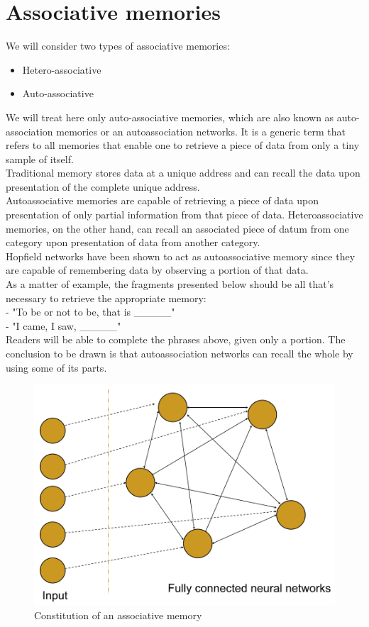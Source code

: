 \section{Associative memories}
We will consider two types of associative memories:
\begin{itemize}
    \item Hetero-associative
    \item Auto-associative
\end{itemize}
We will treat here only auto-associative memories, which are also known as auto-association memories or an autoassociation networks. It is a generic term that refers to all memories that enable one to retrieve a piece of data from only a tiny sample of itself.\\
\linebreak
Traditional memory stores data at a unique address and can recall the data upon presentation of the complete unique address.\\
\linebreak 
Autoassociative memories are capable of retrieving a piece of data upon presentation of only partial information from that piece of data. Heteroassociative memories, on the other hand, can recall an associated piece of datum from one category upon presentation of data from another category.\\
\linebreak 
Hopfield networks have been shown to act as autoassociative memory since they are capable of remembering data by observing a portion of that data.\\
\linebreak
As a matter of example, the fragments presented below should be all that's necessary to retrieve the appropriate memory:\\
- "To be or not to be, that is \_\_\_\_\_" \\
- "I came, I saw, \_\_\_\_\_"\\
Readers will be able to complete the phrases above, given only a portion. The conclusion to be drawn is that autoassociation networks can recall the whole by using some of its parts.
\begin{figure}[h]
    \centering
    \includegraphics[width=0.5\linewidth]{img/associativememory}
    \caption{Constitution of an associative memory}
\end{figure}
